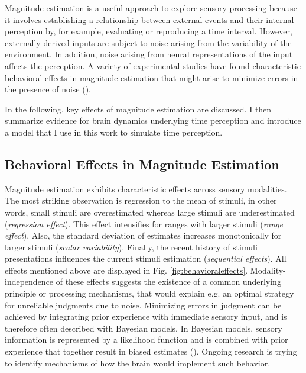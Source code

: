 \documentclass[10pt]{article}
\begin{document}
Magnitude estimation is a useful approach to explore sensory processing because it involves establishing a relationship between external events and their internal perception by, for example, evaluating or reproducing a time interval. 
However, externally-derived inputs are subject to noise arising from the variability of the environment. In addition, noise arising from neural representations of the input affects the perception.
A variety of experimental studies have found characteristic behavioral effects in magnitude estimation that might arise to minimize errors in the presence of noise (\cite{Petzschner2015}).

In the following, key effects of magnitude estimation are discussed. I then summarize evidence for brain dynamics underlying time perception and introduce a model that I use in this work to simulate time perception.

\subsection{Behavioral Effects in Magnitude Estimation}
Magnitude estimation exhibits characteristic effects across sensory modalities.
The most striking observation is regression to the mean of stimuli, in other words, small stimuli are overestimated whereas large stimuli are underestimated (\textit{regression effect}). 
This effect intensifies for ranges with larger stimuli (\textit{range effect}).
Also, the standard deviation of estimates increases monotonically for larger stimuli (\textit{scalar variability}). 
Finally, the recent history of stimuli presentations influences the current stimuli estimation (\textit{sequential effects}).
All effects mentioned above are displayed in Fig. \ref{fig:behavioraleffects}. 
Modality-independence of these effects suggests the existence of a common underlying principle or processing mechanisms, that would explain e.g. an optimal strategy for unreliable judgments due to noise.
Minimizing errors in judgment can be achieved by integrating prior experience with immediate sensory input, and is therefore often described with Bayesian models.
In Bayesian models, sensory information is represented by a likelihood function and is combined with prior experience that together result in biased estimates (\cite{Knill2004}). 
Ongoing research is trying to identify mechanisms of how the brain would implement such behavior. %
\end{document}

